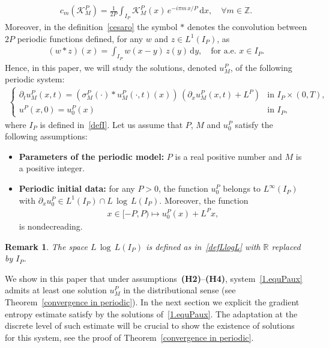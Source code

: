 \documentclass[11pt]{amsart}
\newtheorem{remark}{Remark}
\newcommand{\K}{\mathcal{K}}
\newcommand{\dd}{\mathrm{d}}
\newcommand{\pa}{\partial}
\newcommand{\R}{\mathbb{R}}
\newcommand{\Z}{\mathbb{Z}}
\begin{document}
 \begin{align*}
     c_m(\K^P_M) = \frac{1}{2P} \int_{I_P} \K^P_M(x) \, e^{-i\pi m \, x/P} \, \dd x, \quad \forall m \in \Z.
 \end{align*}
Moreover, in the definition~\eqref{cesaro} the symbol $\ast$ denotes the convolution between $2P$ periodic functions defined, for any $w$ and $z\in L^1(I_P)$, as
\begin{align}\label{conv.prod.perio}
    (w\ast z)(x) = \int_{I_P} w(x-y) \, z(y) \, \dd y, \quad \mbox{for a.e. }x \in I_P.
\end{align}
Hence, in this paper, we will study the solutions, denoted $u^P_M$, of the following periodic system:
 \begin{align}\label{1.equPaux}
 \begin{cases}
\partial_t u^P_M(x, t) = \left(\sigma_M^P(\cdot) \ast u^P_M(\cdot,t)(x)\right) \, \left(\partial_x u^P_M(x, t) + L^P \right) & \mbox{in } I_P \times (0, T),\\
u^P(x,0) = u^P_0(x) & \mbox{in } I_P,
\end{cases}
 \end{align}
 where $I_P$ is defined in~\eqref{defI}. Let us assume that $P$, $M$ and $u^P_0$ satisfy the following assumptions:

 \begin{itemize}
\item[\textbf{(H3)}] {\bf Parameters of the periodic model:} $P$ is a real positive number and $M$ is a positive integer.

\item[\textbf{(H4)}] {\bf Periodic initial data:} for any $P >0$, the function $u^P_0$ belongs to $L^\infty(I_P)$ with $\pa_x u^P_0 \in L^1(I_P) \cap L\,\log\,L(I_P)$. Moreover, the function 
\begin{align*}
    x \in [-P,P) \mapsto u^P_0(x) + L^Px,
\end{align*}
is nondecreading.

\end{itemize}

\begin{remark}
    The space $L\,\log\,L(I_P)$ is defined as in~\eqref{defLlogL} with $\R$ replaced by $I_P$.
\end{remark}
We show in this paper that under assumptions~\textbf{(H2)}--\textbf{(H4)},  system~\eqref{1.equPaux} admits at least one solution $u^P_M$ in the distributional sense (see  Theorem~\ref{convergence in periodic}). In the next section we explicit the gradient entropy estimate satisfy by the solutions of~\eqref{1.equPaux}. The adaptation at the discrete level of such estimate will be crucial to show the existence of solutions for this system, see the proof of Theorem~\ref{convergence in periodic}.
\end{document}
